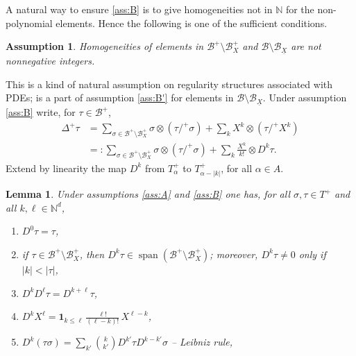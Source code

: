 \documentclass[11pt]{article}
\numberwithin{equation}{section}
\newenvironment{enumeratea}
{\bgroup\def\theenumi{\alph{enumi}}\begin{enumerate}}
{\end{enumerate}\egroup}
\DeclareMathOperator{\Span}{span}
\theoremstyle{plain}
\newtheorem{lem}[thm]{Lemma}
\newtheorem{assumption}{Assumption}
\renewcommand{\theassumption}{\Alph{assumption}}
\theoremstyle{definition}
\newcommand{\bbN}{\mathbb{N}}
\newcommand{\mcB}{\mathcal{B}}
\begin{document}
A natural way to ensure \eqref{ass:B} is to give homogeneities not in $\bbN$ for the non-polynomial elements.
Hence the following is one of the sufficient conditions.

\bgroup
\addtocounter{assumption}{-1}
\renewcommand{\theassumption}{\Alph{assumption}'}\begin{assumption}\label{ass:B'}
Homogeneities of elements in $\mcB^+\setminus\mcB_X^+$ and $\mcB\setminus\mcB_{\underline{X}}$ are not nonnegative integers.
\end{assumption}
\egroup

This is a kind of natural assumption on regularity structures associated with PDEs; \cite[Ass.\,5.3]{Hai} is a part of assumption \eqref{ass:B'} for elements in $\mcB\setminus\mcB_{\underline{X}}$. Under assumption \eqref{ass:B} write, for $\tau\in\mcB^+$,
\begin{equation}\label{def of D^ktau}
\begin{split}
\Delta^+\tau &= \sum_{\sigma\in\mcB^+\setminus\mcB_X^+}\sigma\otimes(\tau/^+\sigma) + \sum_{k}X^k\otimes(\tau/^+X^k) \\
&=: \sum_{\sigma\in\mcB^+\setminus\mcB_X^+}\sigma\otimes(\tau/^+\sigma) + \sum_{k}\frac{X^k}{k!}\otimes D^k\tau.
\end{split}
\end{equation}
Extend by linearity the map $D^k$ from $T_\alpha^+$ to $T_{\alpha-|k|}^+$, for all $\alpha\in A$.

\begin{lem}\label{lem:recursive rules}
Under assumptions \eqref{ass:A} and \eqref{ass:B} one has, for all $\sigma,\tau\in T^+$ and all $k,\ell\in\bbN^d$,
\begin{enumeratea}
	\item\label{lem:recursive rulesa} $D^0\tau = \tau$,
	
	\item\label{lem:recursive rulesb} if $\tau\!\in\!\mcB^+\!\setminus\!\mcB_X^+$, then $D^k\tau\!\in\!\Span (\mcB^+\!\setminus\!\mcB_X^+)$;
	moreover, $D^k\tau\!\neq\! 0$ only if $|k|\!<\!|\tau|$,
		
	\item\label{lem:recursive rulesc} $D^{k}D^\ell\tau = D^{k+\ell}\tau$,

	\item\label{lem:recursive rulesd} $D^{k}X^\ell = \mathbf{1}_{k\le \ell}\, \frac{\ell!}{(\ell-k)!} \, X^{\ell-k}$,
	
	\item\label{lem:recursive rulese} $D^k(\tau\sigma) = \sum_{k'} \binom{k}{k'} D^{k'}\tau D^{k-k'}\sigma$ -- {\sl Leibniz rule},
\end{enumeratea}
\end{lem}
\end{document}
